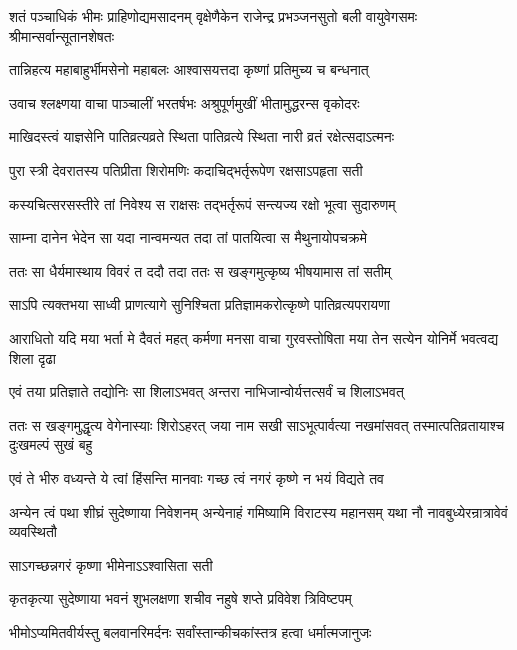 \threelineshloka
{शतं पञ्चाधिकं भीमः प्राहिणोद्यमसादनम्}
{वृक्षेणैकेन राजेन्द्र प्रभञ्जनसुतो बली}
{वायुवेगसमः श्रीमान्सर्वान्सूतानशेषतः}


\twolineshloka
{तान्निहत्य महाबाहुर्भीमसेनो महाबलः}
{आश्वासयत्तदा कृष्णां प्रतिमुच्य च बन्धनात्}


\twolineshloka
{उवाच श्लक्ष्णया वाचा पाञ्चालीं भरतर्षभः}
{अश्रुपूर्णमुखीं भीतामुद्धरन्स वृकोदरः}


\twolineshloka
{माखिदस्त्वं याज्ञसेनि पातिव्रत्यव्रते स्थिता}
{पातिव्रत्ये स्थिता नारी व्रतं रक्षेत्सदाऽत्मनः}


\twolineshloka
{पुरा स्त्री देवरातस्य पतिप्रीता शिरोमणिः}
{कदाचिद्भर्तृरूपेण रक्षसाऽपहृता सती}


\twolineshloka
{कस्यचित्सरसस्तीरे तां निवेश्य स राक्षसः}
{तद्भर्तृरूपं सन्त्यज्य रक्षो भूत्वा सुदारुणम्}


\twolineshloka
{साम्ना दानेन भेदेन सा यदा नान्वमन्यत}
{तदा तां पातयित्वा स मैथुनायोपचक्रमे}


\twolineshloka
{ततः सा धैर्यमास्थाय विवरं त ददौ तदा}
{ततः स खङ्गमुत्कृष्य भीषयामास तां सतीम्}


\twolineshloka
{साऽपि त्यक्तभया साध्वी प्राणत्यागे सुनिश्चिता}
{प्रतिज्ञामकरोत्कृष्णे पातिव्रत्यपरायणा}


\threelineshloka
{आराधितो यदि मया भर्ता मे दैवतं महत्}
{कर्मणा मनसा वाचा गुरवस्तोषिता मया}
{तेन सत्येन योनिर्मे भवत्वद्य शिला दृढा}


\twolineshloka
{एवं तया प्रतिज्ञाते तद्योनिः सा शिलाऽभवत्}
{अन्तरा नाभिजान्वोर्यत्तत्सर्वं च शिलाऽभवत्}


\onelineshloka
{ततः स खङ्गमुद्धृत्य वेगेनास्याः शिरोऽहरत्}
\twolineshloka
{जया नाम सखी साऽभूत्पार्वत्या नखमांसवत्}
{तस्मात्पतिव्रतायाश्च दुःखमल्पं सुखं बहु}


\twolineshloka
{एवं ते भीरु वध्यन्ते ये त्वां हिंसन्ति मानवाः}
{गच्छ त्वं नगरं कृष्णे न भयं विद्यते तव}


\threelineshloka
{अन्येन त्वं पथा शीघ्रं सुदेष्णाया निवेशनम्}
{अन्येनाहं गमिष्यामि विराटस्य महानसम्}
{यथा नौ नावबुध्येरन्रात्रावेवं व्यवस्थितौ}



\onelineshloka
{साऽगच्छन्नगरं कृष्णा भीमेनाऽऽश्वासिता सती}

\twolineshloka
{कृतकृत्या सुदेष्णाया भवनं शुभलक्षणा}
{शचीव नहुषे शप्ते प्रविवेश त्रिविष्टपम्}

\twolineshloka
{भीमोऽप्यमितवीर्यस्तु बलवानरिमर्दनः}
{सर्वांस्तान्कीचकांस्तत्र हत्वा धर्मात्मजानुजः}


